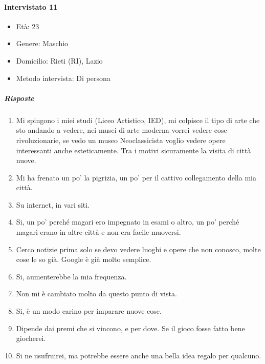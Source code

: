 \documentclass{article}
\begin{document}
\paragraph{Intervistato 11}
\begin{itemize}
\item Età: 23
\item Genere: Maschio
\item Domicilio: Rieti (RI), Lazio
\item Metodo intervista: Di persona
\end{itemize}
\subparagraph{Risposte}
\begin{enumerate}
\item Mi spingono i miei studi (Liceo Artistico, IED), mi colpisce il tipo di arte che sto andando a vedere, nei musei di arte moderna vorrei vedere cose rivoluzionarie, se vedo un museo Neoclassicista voglio vedere opere interessanti anche esteticamente. Tra i motivi sicuramente la visita di città nuove.
\item Mi ha frenato un po' la pigrizia, un po'  per il cattivo collegamento della mia città.
\item Su internet, in vari siti.
\item Si, un po' perché magari ero impegnato in esami o altro, un po' perché magari erano in altre città e non era facile muoversi.
\item Cerco notizie prima solo se devo vedere luoghi e opere che non conosco, molte cose le so già. Google è già molto semplice.
\item Si, aumenterebbe la mia frequenza.
\item Non mi è cambiato molto da questo punto di vista.
\item Si, è un modo carino per imparare nuove cose.
\item Dipende dai premi che si vincono, e per dove. Se il gioco fosse fatto bene giocherei.
\item Si ne usufruirei, ma potrebbe essere anche una bella idea regalo per qualcuno.
\end{enumerate}
\end{document}
